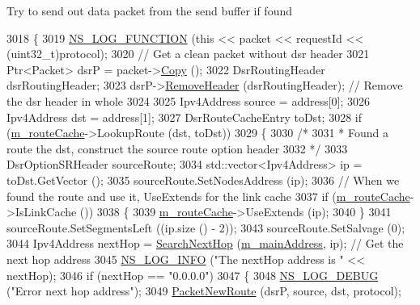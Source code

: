 Try to send out data packet from the send buffer if found 
\begin{DoxyCode}
3018 \{
3019   \hyperlink{log-macros-disabled_8h_a90b90d5bad1f39cb1b64923ea94c0761}{NS\_LOG\_FUNCTION} (\textcolor{keyword}{this} << packet << requestId << (uint32\_t)protocol);
3020   \textcolor{comment}{// Get a clean packet without dsr header}
3021   Ptr<Packet> dsrP = packet->\hyperlink{classns3_1_1Packet_a5d5c70802a5f77fc5f0001e0cfc1898b}{Copy} ();
3022   DsrRoutingHeader dsrRoutingHeader;
3023   dsrP->\hyperlink{classns3_1_1Packet_a0961eccf975d75f902d40956c93ba63e}{RemoveHeader} (dsrRoutingHeader);          \textcolor{comment}{// Remove the dsr header in whole}
3024 
3025   Ipv4Address source = address[0];
3026   Ipv4Address dst = address[1];
3027   DsrRouteCacheEntry toDst;
3028   \textcolor{keywordflow}{if} (\hyperlink{classns3_1_1dsr_1_1DsrRouting_ac409bdb961b9fff0fb63ebd026be99ad}{m\_routeCache}->LookupRoute (dst, toDst))
3029     \{
3030       \textcolor{comment}{/*}
3031 \textcolor{comment}{       * Found a route the dst, construct the source route option header}
3032 \textcolor{comment}{       */}
3033       DsrOptionSRHeader sourceRoute;
3034       std::vector<Ipv4Address> ip = toDst.GetVector ();
3035       sourceRoute.SetNodesAddress (ip);
3036       \textcolor{comment}{// When we found the route and use it, UseExtends for the link cache}
3037       \textcolor{keywordflow}{if} (\hyperlink{classns3_1_1dsr_1_1DsrRouting_ac409bdb961b9fff0fb63ebd026be99ad}{m\_routeCache}->IsLinkCache ())
3038         \{
3039           \hyperlink{classns3_1_1dsr_1_1DsrRouting_ac409bdb961b9fff0fb63ebd026be99ad}{m\_routeCache}->UseExtends (ip);
3040         \}
3041       sourceRoute.SetSegmentsLeft ((ip.size () - 2));
3043       sourceRoute.SetSalvage (0);
3044       Ipv4Address nextHop = \hyperlink{classns3_1_1dsr_1_1DsrRouting_aa1b16658c14499af76ca7dd69c034f22}{SearchNextHop} (\hyperlink{classns3_1_1dsr_1_1DsrRouting_a73182b5edee2d8460f28855e058fc9a0}{m\_mainAddress}, ip);       \textcolor{comment}{// Get the
       next hop address}
3045       \hyperlink{group__logging_gafbd73ee2cf9f26b319f49086d8e860fb}{NS\_LOG\_INFO} (\textcolor{stringliteral}{"The nextHop address is "} << nextHop);
3046       \textcolor{keywordflow}{if} (nextHop == \textcolor{stringliteral}{"0.0.0.0"})
3047         \{
3048           \hyperlink{group__logging_ga413f1886406d49f59a6a0a89b77b4d0a}{NS\_LOG\_DEBUG} (\textcolor{stringliteral}{"Error next hop address"});
3049           \hyperlink{classns3_1_1dsr_1_1DsrRouting_ae70ab39db551d1d81afc081196f78017}{PacketNewRoute} (dsrP, source, dst, protocol);

\end{DoxyCode}
